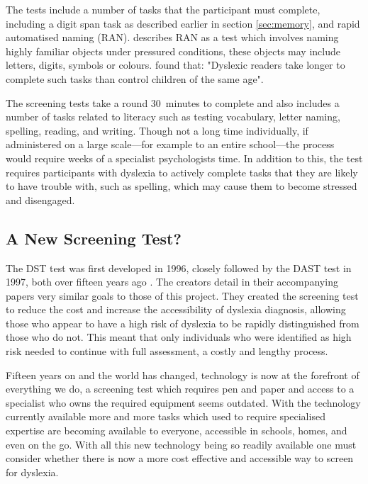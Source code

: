 \documentclass[journal]{IEEEtran}
\begin{document}
The tests include a number of tasks that the participant must complete, including a digit span task as described earlier in section \ref{sec:memory}, and rapid automatised naming (RAN). \cite{snowling} describes RAN as a test which involves naming highly familiar objects under pressured conditions, these objects may include letters, digits, symbols or colours. \cite{snowling} found that: "Dyslexic readers take longer to complete such tasks than control children of the same age".
 
The screening tests take a round 30~minutes to complete and also includes a number of tasks related to literacy such as testing vocabulary, letter naming, spelling, reading, and writing\cite{screeningTests}. Though not a long time individually, if administered on a large scale---for example to an entire school---the process would require weeks of a specialist psychologists time. In addition to this, the test requires participants with dyslexia to actively complete tasks that they are likely to have trouble with, such as spelling, which may cause them to become stressed and disengaged. 

\subsection{A New Screening Test?}
The DST test was first developed in 1996, closely followed by the DAST test in 1997, both over fifteen years ago \cite{dastTest, dstTest}. The creators detail in their accompanying papers very similar goals to those of this project. They created the screening test to reduce the cost and increase the accessibility of dyslexia diagnosis, allowing those who appear to have a high risk of dyslexia to be rapidly distinguished from those who do not. This meant that only individuals who were identified as high risk needed to continue with full assessment, a costly and lengthy process.

Fifteen years on and the world has changed, technology is now at the forefront of everything we do, a screening test which requires pen and paper and access to a specialist who owns the required equipment seems outdated. 
With the technology currently available more and more tasks which used to require specialised expertise are becoming available to everyone, accessible in schools, homes, and even on the go. With all this new technology being so readily available one must consider whether there is now a more cost effective and accessible way to screen for dyslexia.
\end{document}
